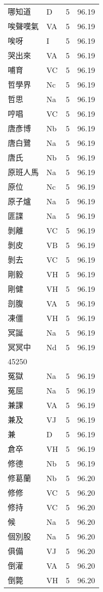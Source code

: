 \documentclass[twocolumn]{book}
\begin{document}
\begin{supertabular}{llrr}
哪知道 & D & 5 &  96.19\\
唉聲嘆氣 & VA & 5 &  96.19\\
唉呀 & I & 5 &  96.19\\
哭出來 & VA & 5 &  96.19\\
哺育 & VC & 5 &  96.19\\
哲學界 & Nc & 5 &  96.19\\
哲思 & Na & 5 &  96.19\\
哼唱 & VC & 5 &  96.19\\
唐彥博 & Nb & 5 &  96.19\\
唐白鷺 & Na & 5 &  96.19\\
唐氏 & Nb & 5 &  96.19\\
原班人馬 & Na & 5 &  96.19\\
原位 & Nc & 5 &  96.19\\
原子爐 & Na & 5 &  96.19\\
匪諜 & Na & 5 &  96.19\\
剝離 & VC & 5 &  96.19\\
剝皮 & VB & 5 &  96.19\\
剝去 & VC & 5 &  96.19\\
剛毅 & VH & 5 &  96.19\\
剛健 & VH & 5 &  96.19\\
剖腹 & VA & 5 &  96.19\\
凍僵 & VH & 5 &  96.19\\
冥誕 & Na & 5 &  96.19\\
冥冥中 & Nd & 5 &  96.19\\
45250\\
冤獄 & Na & 5 &  96.19\\
冤屈 & Na & 5 &  96.19\\
兼課 & VA & 5 &  96.19\\
兼及 & VJ & 5 &  96.19\\
兼 & D & 5 &  96.19\\
倉卒 & VH & 5 &  96.19\\
修德 & Nb & 5 &  96.19\\
修葛蘭 & Nb & 5 &  96.20\\
修修 & VC & 5 &  96.20\\
修持 & VC & 5 &  96.20\\
候 & Na & 5 &  96.20\\
個別股 & Na & 5 &  96.20\\
俱備 & VJ & 5 &  96.20\\
倒灌 & VA & 5 &  96.20\\
倒斃 & VH & 5 &  96.20\\

\end{supertabular}
\end{document}

